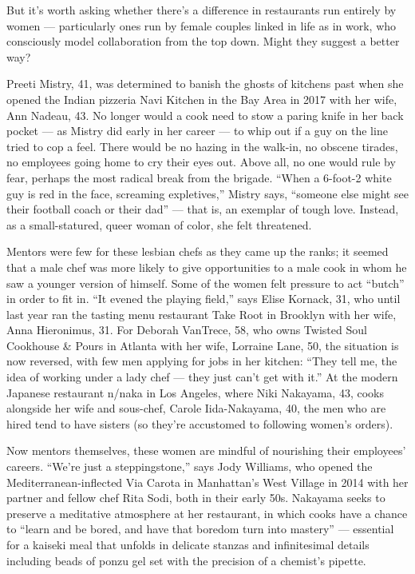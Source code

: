But it's worth asking whether there's a difference in restaurants run
entirely by women --- particularly ones run by female couples linked in
life as in work, who consciously model collaboration from the top down.
Might they suggest a better way?

Preeti Mistry, 41, was determined to banish the ghosts of kitchens past
when she opened the Indian pizzeria Navi Kitchen in the Bay Area in 2017
with her wife, Ann Nadeau, 43. No longer would a cook need to stow a
paring knife in her back pocket --- as Mistry did early in her career
--- to whip out if a guy on the line tried to cop a feel. There would be
no hazing in the walk-in, no obscene tirades, no employees going home to
cry their eyes out. Above all, no one would rule by fear, perhaps the
most radical break from the brigade. ``When a 6-foot-2 white guy is red
in the face, screaming expletives,'' Mistry says, ``someone else might
see their football coach or their dad'' --- that is, an exemplar of
tough love. Instead, as a small-statured, queer woman of color, she felt
threatened.

Mentors were few for these lesbian chefs as they came up the ranks; it
seemed that a male chef was more likely to give opportunities to a male
cook in whom he saw a younger version of himself. Some of the women felt
pressure to act ``butch'' in order to fit in. ``It evened the playing
field,'' says Elise Kornack, 31, who until last year ran the tasting
menu restaurant Take Root in Brooklyn with her wife, Anna Hieronimus,
31. For Deborah VanTrece, 58, who owns Twisted Soul Cookhouse \& Pours
in Atlanta with her wife, Lorraine Lane, 50, the situation is now
reversed, with few men applying for jobs in her kitchen: ``They tell me,
the idea of working under a lady chef --- they just can't get with it.''
At the modern Japanese restaurant n/naka in Los Angeles, where Niki
Nakayama, 43, cooks alongside her wife and sous-chef, Carole
Iida-Nakayama, 40, the men who are hired tend to have sisters (so
they're accustomed to following women's orders).

Now mentors themselves, these women are mindful of nourishing their
employees' careers. ``We're just a steppingstone,'' says Jody Williams,
who opened the Mediterranean-inflected Via Carota in Manhattan's West
Village in 2014 with her partner and fellow chef Rita Sodi, both in
their early 50s. Nakayama seeks to preserve a meditative atmosphere at
her restaurant, in which cooks have a chance to ``learn and be bored,
and have that boredom turn into mastery'' --- essential for a kaiseki
meal that unfolds in delicate stanzas and infinitesimal details
including beads of ponzu gel set with the precision of a chemist's
pipette.

